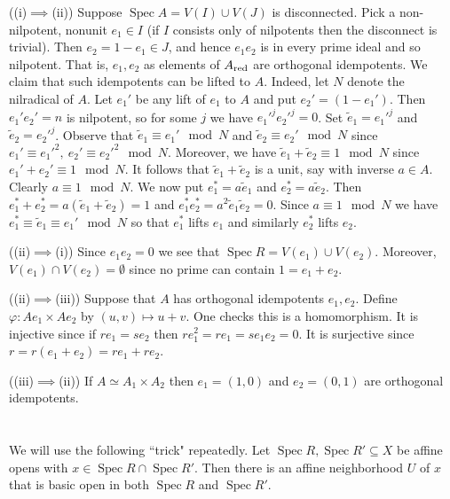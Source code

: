 \documentclass{report}
\DeclareMathOperator{\Spec}{Spec}
\begin{document}
\bigskip
{} ((i)$\implies$(ii))		Suppose $\Spec A=V(I)\cup V(J)$ is disconnected.  Pick a non-nilpotent, nonunit $e_1\in I$
(if $I$ consists only of nilpotents then the disconnect is trivial).  Then $e_2=1-e_1\in J$, and hence $e_1e_2$
is in every prime ideal and so nilpotent.  That is, $e_1,e_2$ as elements of $A_{\rm red}$ are orthogonal idempotents.
We claim that such idempotents can be lifted to $A$.  Indeed, let $N$ denote the nilradical of $A$.
 Let $e_1'$ be any lift of $e_1$ to $A$ and put $e_2'=(1-e_1')$.  Then $e_1'e_2'=n$ is nilpotent, so for some $j$ we have
${e_1'}^j{e_2'}^j=0$.  Set $\tilde{e}_1={e_1'}^j$ and $\tilde{e}_2={e_2'}^j$.  Observe that $\tilde{e}_1\equiv e_1' \mod N$
 and $\tilde{e}_2\equiv e_2' \mod N$ since $e_1'\equiv {e_1'}^2,\ e_2'\equiv {e_2'}^2\mod N$.  Moreover, we have $\tilde{e}_1+\tilde{e}_2\equiv 1\mod N$
 since $e_1'+e_2'\equiv 1\mod N$.  It follows that $\tilde{e}_1+\tilde{e}_2$ is a unit, say with inverse $a\in A$.  Clearly $a\equiv 1\mod N$.
 We now put $e_1^*=a\tilde{e}_1$ and $e_2^*=a\tilde{e}_2$.  Then $e_1^*+e_2^*=a(\tilde{e}_1+\tilde{e}_2)=1$ and $e_1^* e_2^*=a^2 \tilde{e}_1\tilde{e}_2=0$.
  Since $a\equiv 1\mod N$ we have
 $e_1^*\equiv \tilde{e}_1\equiv e_1' \mod N$ so that $e_1^*$ lifts $e_1$ and similarly $e_2^*$ lifts $e_2$.        

\noindent
((ii)$\implies$(i))	Since $e_1e_2=0$ we see that $\Spec R=V(e_1)\cup V(e_2)$.  Moreover, $V(e_1)\cap V(e_2)=\emptyset$
since no prime can contain $1=e_1+e_2$.

\noindent
((ii)$\implies$(iii))	Suppose that $A$ has orthogonal idempotents $e_1,e_2$.  Define $\varphi:Ae_1\times Ae_2$ by $(u,v)\mapsto u+v$.
One checks this is a homomorphism.  It is injective since if $re_1=se_2$ then $re_1^2=re_1=se_1e_2=0$.  It is
surjective since $r=r(e_1+e_2)=re_1+re_2$.	

\noindent
((iii)$\implies$(ii))	If $A\simeq A_1\times A_2$ then $e_1=(1,0)$ and $e_2=(0,1)$ are orthogonal idempotents.



\section{}

 We will use the following ``trick" repeatedly.  Let $\Spec R,\Spec R'\subseteq X$
be affine opens with $x\in \Spec R\cap \Spec R'$.  Then there is an affine neighborhood $U$ of $x$ that is
basic open in both $\Spec R$ and $\Spec R'$.		
\end{document}
